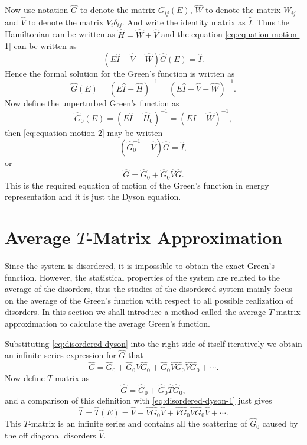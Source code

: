 \documentclass{book}
\numberwithin{equation}{section}
\begin{document}
Now use notation $\hat{G}$ to denote the matrix $G_{ij}(E)$, $\hat{W}$
to denote the matrix $W_{ij}$ and $\hat{V}$ to denote the matrix
$V_i\delta_{ij}$. And write the identity matrix as $\hat{I}$. Thus the
Hamiltonian can be written as $\hat{H}=\hat{W}+\hat{V}$ and the
equation \eqref{eq:equation-motion-1} can be written as
\begin{equation}
  \label{eq:equation-motion-2}
  (E\hat{I}-\hat{V}-\hat{W})\hat{G}(E)=\hat{I}.
\end{equation}
Hence the formal solution for the Green's function is written as
\begin{equation}
  \label{eq:equation-motion-solution}
  \hat{G}(E)=(E\hat{I}-\hat{H})^{-1}=(E\hat{I}-\hat{V}-\hat{W})^{-1}.
\end{equation}
Now define the unperturbed Green's function as
\begin{equation}
  \hat{G}_0(E)=(E\hat{I}-\hat{H}_0)^{-1}=(E\hat{I}-\hat{W})^{-1}, 
\end{equation}
then \eqref{eq:equation-motion-2} may be written 
\begin{equation}
  (\hat{G}_0^{-1}-\hat{V})\hat{G}=\hat{I},
\end{equation}
or
\begin{equation}
  \label{eq:disordered-dyson}
  \hat{G}=\hat{G}_0+\hat{G}_0\hat{V}\hat{G}.
\end{equation}
This is the required equation of motion of the Green's function in
energy representation and it is just the Dyson equation.

\section{Average $T$-Matrix Approximation}
Since the system is disordered, it is impossible to obtain the exact
Green's function. However, the statistical properties of the system
are related to the average of the disorders, thus the studies of the
disordered system mainly focus on the average of the Green's function
with respect to all possible realization of disorders. In this section
we shall introduce a method called the average $T$-matrix
approximation to calculate the average Green's function.

Substituting \eqref{eq:disordered-dyson} into the right side of itself
iteratively we obtain an infinite series expression for $\hat{G}$ that
\begin{equation}
  \label{eq:disordered-dyson-1}
  \hat{G}=\hat{G}_0+\hat{G}_0\hat{V}\hat{G}_0+
  \hat{G}_0\hat{V}\hat{G}_0\hat{V}\hat{G}_0+\cdots.
\end{equation}
Now define $T$-matrix as
\begin{equation}
  \hat{G}=\hat{G}_0+\hat{G}_0\hat{T}\hat{G}_0,
\end{equation}
and a comparison of this definition with \eqref{eq:disordered-dyson-1}
just gives
\begin{equation}
  \label{eq:T-matrix}
  \hat{T}=\hat{T}(E)=\hat{V}+\hat{V}\hat{G}_0\hat{V}+
  \hat{V}\hat{G}_0\hat{V}\hat{G}_0\hat{V}+\cdots.
\end{equation}
This $T$-matrix is an infinite series and contains all the scattering
of $\hat{G}_0$ caused by the off diagonal disorders $\hat{V}$.
\end{document}
